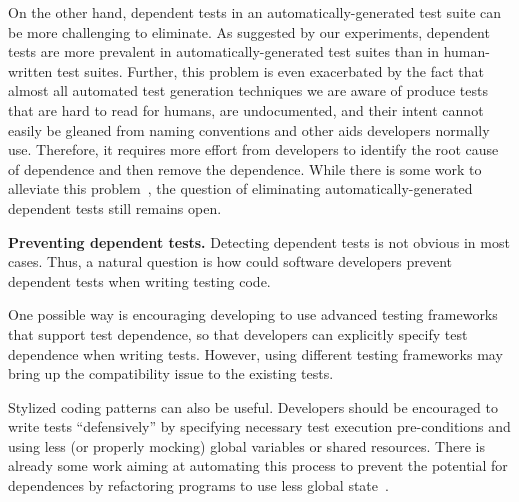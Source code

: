 On the other hand, dependent tests in
an automatically-generated test suite can be 
more challenging to eliminate.
As suggested by our experiments, dependent tests are
more prevalent in automatically-generated test suites
than in human-written test suites.
Further, this problem is even exacerbated by the fact that
almost all automated test generation
techniques we are aware of produce tests
that are hard to read for humans, are undocumented, and their intent
cannot easily be gleaned from naming conventions and other aids
developers normally use. Therefore, it requires more effort
from developers to identify the root cause of dependence
and then remove the dependence. While there is some work to alleviate
this problem~\cite{fraseretal:ISSTA:2011}, the question
of eliminating  automatically-generated dependent tests
still remains open.




\vspace{1mm}


\noindent \textbf{{Preventing dependent tests.}}
Detecting dependent tests is not obvious in most
cases. Thus, a natural question is how could
software developers prevent dependent tests when
writing testing code.

One possible way is encouraging developing to
use advanced testing frameworks that support test dependence,
so that developers can explicitly specify test
dependence when writing tests.
However, using different testing frameworks may
bring up the compatibility issue to the existing tests.

Stylized coding patterns can also be useful. Developers
should be encouraged to write tests ``defensively'' by
specifying necessary test execution pre-conditions and
using less (or properly mocking) global variables or shared resources. 
There is already some work aiming at automating this
process to prevent the potential
for dependences by refactoring programs to use
less global state~\cite{wlokaetal:FSE:2009}. 




